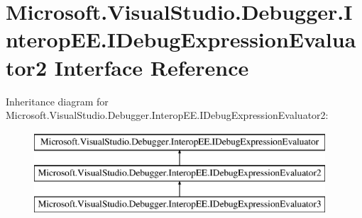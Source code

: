 \hypertarget{interface_microsoft_1_1_visual_studio_1_1_debugger_1_1_interop_e_e_1_1_i_debug_expression_evaluator2}{\section{Microsoft.\+Visual\+Studio.\+Debugger.\+Interop\+E\+E.\+I\+Debug\+Expression\+Evaluator2 Interface Reference}
\label{interface_microsoft_1_1_visual_studio_1_1_debugger_1_1_interop_e_e_1_1_i_debug_expression_evaluator2}
}
Inheritance diagram for Microsoft.\+Visual\+Studio.\+Debugger.\+Interop\+E\+E.\+I\+Debug\+Expression\+Evaluator2\+:\begin{figure}[H]
\begin{center}
\leavevmode
\includegraphics[height=3.000000cm]{interface_microsoft_1_1_visual_studio_1_1_debugger_1_1_interop_e_e_1_1_i_debug_expression_evaluator2}
\end{center}
\end{figure}
